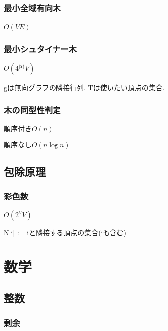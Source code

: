 \documentclass[9pt,twocolumn,a4paper,landscape]{extarticle}
\begin{document}
\subsubsection{最小全域有向木}
$O(VE)$

\subsubsection{最小シュタイナー木}
$O(4^{|T|}V)$ \par
gは無向グラフの隣接行列. Tは使いたい頂点の集合.\par

\subsubsection{木の同型性判定}
順序付き$O(n)$\par
順序なし$O(n\log n)$


\subsection{包除原理}
\subsubsection{彩色数}
$O(2^VV)$\par
N[i] := iと隣接する頂点の集合(iも含む)\par


\section{数学}
\subsection{整数}
\subsubsection{剰余}

\end{document}
